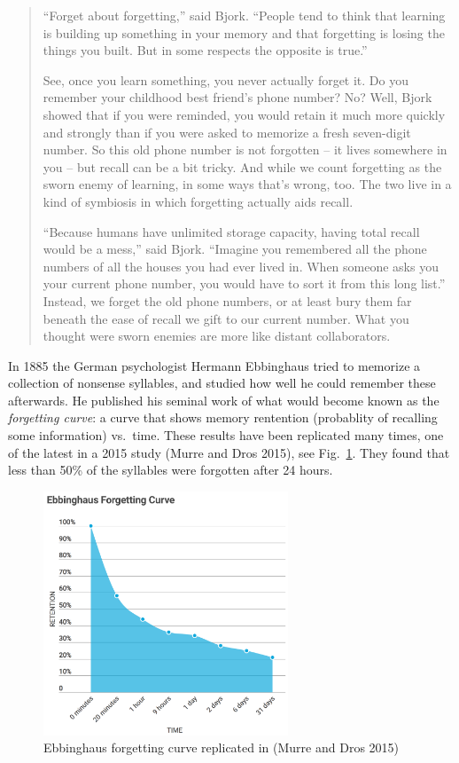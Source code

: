\begin{quote}
``Forget about forgetting,'' said Bjork. ``People tend to think that
learning is building up something in your memory and that forgetting is
losing the things you built. But in some respects the opposite is
true.''

See, once you learn something, you never actually forget it. Do you
remember your childhood best friend's phone number? No? Well, Bjork
showed that if you were reminded, you would retain it much more quickly
and strongly than if you were asked to memorize a fresh seven-digit
number. So this old phone number is not forgotten -- it lives somewhere
in you -- but recall can be a bit tricky. And while we count forgetting
as the sworn enemy of learning, in some ways that's wrong, too. The two
live in a kind of symbiosis in which forgetting actually aids recall.

``Because humans have unlimited storage capacity, having total recall
would be a mess,'' said Bjork. ``Imagine you remembered all the phone
numbers of all the houses you had ever lived in. When someone asks you
your current phone number, you would have to sort it from this long
list.'' Instead, we forget the old phone numbers, or at least bury them
far beneath the ease of recall we gift to our current number. What you
thought were sworn enemies are more like distant collaborators.
\end{quote}

In 1885 the German psychologist Hermann Ebbinghaus tried to memorize a
collection of nonsense syllables, and studied how well he could remember
these afterwards. He published his seminal work of what would become
known as the \emph{forgetting curve}: a curve that shows memory
rentention (probablity of recalling some information) vs.~time. These
results have been replicated many times, one of the latest in a 2015
study (Murre and Dros 2015), see Fig.~\ref{fig:forgetting-curve}. They
found that less than 50\% of the syllables were forgotten after 24
hours.

\begin{figure}
\centering
\includegraphics[width=0.65000\textwidth]{assets/ebbinghaus-forgetting-curive-2015.png}
\caption{Ebbinghaus forgetting curve replicated in (Murre and Dros
2015)}\label{fig:forgetting-curve}
\end{figure}

